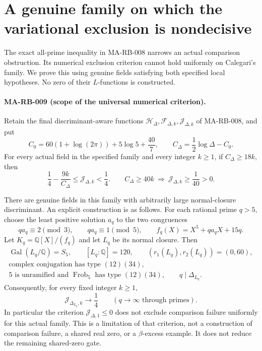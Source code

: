 \section{A genuine family on which the variational exclusion is nondecisive}
\label{sec:s5-endpoint-scope}

The exact all-prime inequality in MA-RB-008 narrows an actual
comparison obstruction. Its numerical exclusion criterion
cannot hold uniformly on Calegari's family. We prove this
using genuine fields satisfying both specified local
hypotheses. No zero of their \(L\)-functions is constructed.

\paragraph{MA-RB-009 (scope of the universal numerical criterion).}
Retain the final discriminant-aware functions
\(\mathcal H_\Delta,\mathcal F_{\Delta,k},\mathcal J_{\Delta,k}\)
of MA-RB-008, and put
\[
 C_0=60(1+\log(2\pi))+5\log5+\frac{40}{7},
 \qquad C_\Delta=\frac12\log\Delta-C_0 .
 \tag{MA-RB.97}
\]
For every actual field in the specified family and every
integer \(k\ge1\), if \(C_\Delta\ge18k\), then
\[
 \frac14-\frac{9k}{C_\Delta}
       \le\mathcal J_{\Delta,k}<\frac14.
 \qquad
 C_\Delta\ge40k\ \Longrightarrow\
                      \mathcal J_{\Delta,k}\ge\frac1{40}>0 .
 \tag{MA-RB.98}
\]

There are genuine fields in this family with arbitrarily
large normal-closure discriminant. An explicit construction
is as follows. For each rational prime \(q>5\), choose
the least positive solution \(a_q\) to the two congruences
\[
 qa_q\equiv2\pmod3,\qquad qa_q\equiv1\pmod5,
 \qquad
 f_q(X)=X^5+qa_qX+15q .
 \tag{MA-RB.99}
\]
Let \(K_q=\mathbb Q[X]/(f_q)\) and let \(L_q\) be its
normal closure. Then
\[
 \begin{gathered}
 \operatorname{Gal}(L_q/\mathbb Q)=S_5,\qquad
 [L_q:\mathbb Q]=120,\qquad
 (r_1(L_q),r_2(L_q))=(0,60),\\
 \text{complex conjugation has type }(12)(34),\\
 5\text{ is unramified and }
       \operatorname{Frob}_5\text{ has type }(12)(34),\qquad
 q\mid\Delta_{L_q}.
 \end{gathered}
 \tag{MA-RB.100}
\]
Consequently, for every fixed integer \(k\ge1\),
\[
                \mathcal J_{\Delta_{L_q},k}
                        \longrightarrow\frac14
                   \qquad(q\longrightarrow\infty
                         \text{ through primes}).
 \tag{MA-RB.101}
\]
In particular the criterion
\(\mathcal J_{\Delta,1}\le0\) does not exclude comparison
failure uniformly for this actual family.
This is a limitation of that criterion, not a construction
of comparison failure, a shared real zero, or a
\(\beta\)-excess example. It does not reduce the remaining
shared-zero gate.

